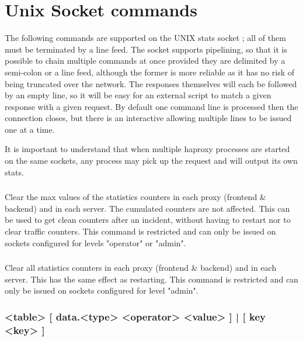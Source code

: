 \section{Unix Socket commands}
\label{sec:socket_commands}

The following commands are supported on the UNIX stats socket ; all of them
must be terminated by a line feed. The socket supports pipelining, so that it
is possible to chain multiple commands at once provided they are delimited by
a semi-colon or a line feed, although the former is more reliable as it has no
risk of being truncated over the network. The responses themselves will each be
followed by an empty line, so it will be easy for an external script to match a
given response with a given request. By default one command line is processed
then the connection closes, but there is an interactive allowing multiple lines
to be issued one at a time.

It is important to understand that when multiple haproxy processes are started
on the same sockets, any process may pick up the request and will output its
own stats.

\subsubsection[clear counters]{}

  Clear the max values of the statistics counters in each proxy (frontend \&
  backend) and in each server. The cumulated counters are not affected. This
  can be used to get clean counters after an incident, without having to
  restart nor to clear traffic counters. This command is restricted and can
  only be issued on sockets configured for levels "operator" or "admin".

\subsubsection[clear counters all]{}

  Clear all statistics counters in each proxy (frontend \& backend) and in each
  server. This has the same effect as restarting. This command is restricted
  and can only be issued on sockets configured for level "admin".

\subsubsection[clear table]{ <table> [ data.<type> <operator> <value> ] | [ key <key> ]}

